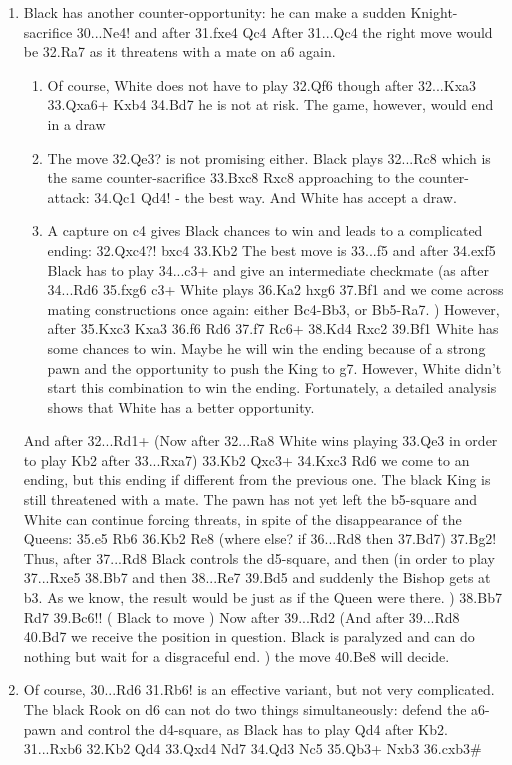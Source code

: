 \documentclass[
	11pt,twocolumn]{article}
\begin{document}
\begin{enumerate}
\item
Black has another counter-opportunity: he can make a sudden Knight-sacrifice 30...Ne4!  and after 31.fxe4 Qc4  After 31...Qc4 the right move would be 32.Ra7  as it threatens with a mate on a6 again. 

\begin{enumerate}
\item
Of course, White does not have to play 32.Qf6  though after 32...Kxa3 33.Qxa6+ Kxb4 34.Bd7 he is not at risk. The game, however, would end in a draw 

\item
The move 32.Qe3?  is not promising either. Black plays 32...Rc8  which is the same counter-sacrifice 33.Bxc8 Rxc8  approaching to the counter-attack: 34.Qc1 Qd4! - the best way. And White has accept a draw. 

\item
A capture on c4 gives Black chances to win and leads to a complicated ending: 32.Qxc4?! bxc4 33.Kb2  The best move is 33...f5  and after 34.exf5  Black has to play 34...c3+  and give an intermediate checkmate (as after 34...Rd6 35.fxg6 c3+  White plays 36.Ka2 hxg6 37.Bf1 and we come across mating constructions once again: either Bc4-Bb3, or Bb5-Ra7. ) However, after 35.Kxc3 Kxa3 36.f6 Rd6 37.f7 Rc6+ 38.Kd4 Rxc2 39.Bf1 White has some chances to win. Maybe he will win the ending because of a strong pawn and the opportunity to push the King to g7. However, White didn't start this combination to win the ending. Fortunately, a detailed analysis shows that White has a better opportunity. 
\end{enumerate}

And after 32...Rd1+ (Now after 32...Ra8  White wins playing 33.Qe3  in order to play Kb2 after 33...Rxa7) 33.Kb2 Qxc3+ 34.Kxc3 Rd6  we come to an ending, but this ending if different from the previous one. The black King is still threatened with a mate. The pawn has not yet left the b5-square and White can continue forcing threats, in spite of the disappearance of the Queens: 35.e5 Rb6 36.Kb2 Re8 (where else? if 36...Rd8  then 37.Bd7) 37.Bg2!  Thus, after 37...Rd8  Black controls the d5-square, and then (in order to play 37...Rxe5 38.Bb7  and then 38...Re7 39.Bd5 and suddenly the Bishop gets at b3. As we know, the result would be just as if the Queen were there. ) 38.Bb7 Rd7 39.Bc6!!  ( Black to move ) Now after 39...Rd2 (And after 39...Rd8 40.Bd7 we receive the position in question. Black is paralyzed and can do nothing but wait for a disgraceful end. ) the move 40.Be8 will decide. 

\item
Of course, 30...Rd6 31.Rb6!  is an effective variant, but not very complicated. The black Rook on d6 can not do two things simultaneously: defend the a6-pawn and control the d4-square, as Black has to play Qd4 after Kb2. 31...Rxb6 32.Kb2 Qd4 33.Qxd4 Nd7 34.Qd3 Nc5 35.Qb3+ Nxb3 36.cxb3\# \end{enumerate}
\end{document}
